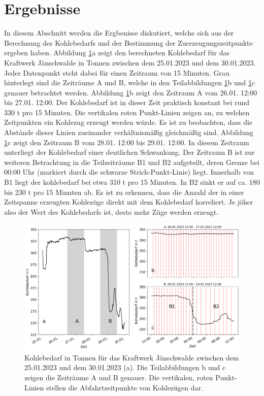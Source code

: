 \section{Ergebnisse}

In diesem Abschnitt werden die Ergbenisse diskutiert, welche sich aus der Berechnung des Kohlebedarfs und der Bestimmung der Zuerzeugungszeitpunkte ergeben haben. Abbildung \ref{fig:results-departures}a zeigt den berechneten Kohlebedarf für das Kraftwerk Jänschwalde in Tonnen zwischen dem 25.01.2023 und dem 30.01.2023. Jeder Datenpunkt steht dabei für einen Zeitraum von 15 Minuten. Grau hinterlegt sind die Zeiträume A und B, welche in den Teilabbildungen \ref{fig:results-departures}b und \ref{fig:results-departures}c genauer betrachtet werden. Abbildung \ref{fig:results-departures}b zeigt den Zeitraum A vom 26.01. 12:00 bis 27.01. 12:00. Der Kohlebedarf ist in dieser Zeit praktisch konstant bei rund 330 t pro 15 Minuten. Die vertikalen roten Punkt-Linien zeigen an, zu welchen Zeitpunkten ein Kohlezug erzeugt werden würde. Es ist zu beobachten, dass die Abstände dieser Linien zueinander verhältnismäßig gleichmäßig sind. Abbildung \ref{fig:results-departures}c zeigt den Zeitraum B vom 28.01. 12:00 bis 29.01. 12:00. In diesem Zeitraum unterliegt der Kohlebedarf einer deutlichen Schwankung. Der Zeitraum B ist zur weiteren Betrachtung in die Teilzeiträume B1 und B2 aufgeteilt, deren Grenze bei 00:00 Uhr (markiert durch die schwarze Strich-Punkt-Linie) liegt. Innerhalb von B1 liegt der kohlebedarf bei etwa 310 t pro 15 Minuten. In B2 sinkt er auf ca. 180 bis 230 t pro 15 Minuten ab. Es ist zu erkennen, dass die Anzahl der in einer Zeitspanne erzeugten Kohlezüge direkt mit dem Kohlebedarf korreliert. Je jöher also der Wert des Kohlebedarfs ist, desto mehr Züge werden erzeugt.

\begin{figure}[H]
	\centering
	\includegraphics[width=1.0\linewidth]{images/results/departures.png}
	\caption{Kohlebedarf in Tonnen für das Kraftwerk Jänschwalde zwischen dem 25.01.2023 und dem 30.01.2023 (a). Die Teilabbildungen b und c zeigen die Zeiträume A und B genauer. Die vertikalen, roten Punkt-Linien stellen die Abfahrtzeitpunkte von Kohlezügen dar.}
	\label{fig:results-departures}
\end{figure}

